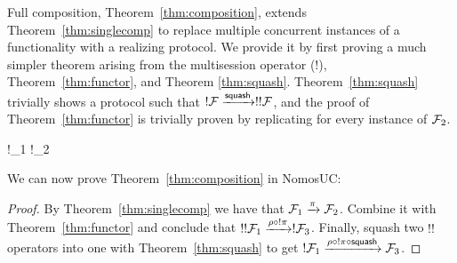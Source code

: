 Full composition, Theorem~\ref{thm:composition}, extends Theorem~\ref{thm:singlecomp} to replace multiple concurrent instances of a functionality with a realizing protocol.
We provide it by first proving a much simpler theorem arising from the multisession operator ($!$), Theorem~\ref{thm:functor}, and Theorem \ref{thm:squash}.
Theorem~\ref{thm:squash} trivially shows a protocol  such that $!\mathcal{F} \xrightarrow{\mathsf{squash}} !!\mathcal{F}$, and the proof of Theorem~\ref{thm:functor} is trivially proven by replicating \SIM{\pi} for every instance of $\mathcal{F}_2$.  

\begin{theorem}\label{thm:functor}
	\begin{mathpar}
		{
			!\F_1 \xrightarrow{!\pi} !\F_2
		}
	\end{mathpar}
\end{theorem}

We can now prove Theorem~\ref{thm:composition} in NomosUC:
\begin{proof}
By Theorem~\ref{thm:singlecomp} we have that $\mathcal{F}_1 \xrightarrow{\pi} \mathcal{F}_2$. Combine it with Theorem~\ref{thm:functor} and conclude that $!!\mathcal{F}_1 \xrightarrow{\rho \circ !\pi} !\mathcal{F}_3$. 
Finally, squash two $!!$ operators into one with Theorem~\ref{thm:squash} to get $!\mathcal{F}_1 \xrightarrow{\rho \circ !\pi \circ \mathsf{squash}} \mathcal{F}_3$.
\end{proof}

